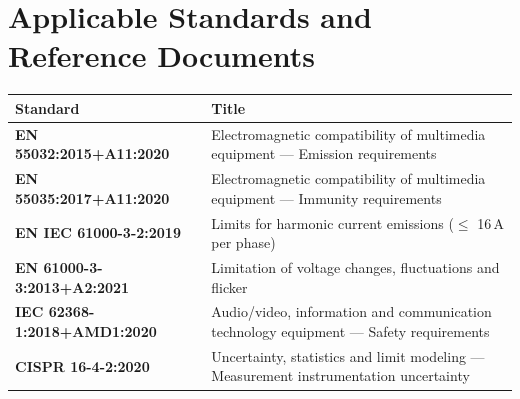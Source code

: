 \section{Applicable Standards and Reference Documents}
\begin{table}[H]
\centering
\small
\begin{tabularx}{\linewidth}{@{} >{\bfseries\color{accent}}p{3.1cm} Y @{}}
\toprule
\textbf{Standard} & \textbf{Title} \\
\midrule
EN 55032:2015+A11:2020     & Electromagnetic compatibility of multimedia equipment --- Emission requirements \\
EN 55035:2017+A11:2020     & Electromagnetic compatibility of multimedia equipment --- Immunity requirements \\
EN IEC 61000-3-2:2019      & Limits for harmonic current emissions ($\leq$ 16\,A per phase) \\
EN 61000-3-3:2013+A2:2021  & Limitation of voltage changes, fluctuations and flicker \\
IEC 62368-1:2018+AMD1:2020 & Audio/video, information and communication technology equipment --- Safety requirements \\
CISPR 16-4-2:2020          & Uncertainty, statistics and limit modeling --- Measurement instrumentation uncertainty \\
\bottomrule
\end{tabularx}
\end{table}

